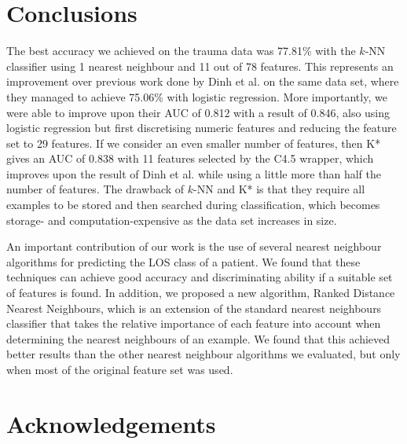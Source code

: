 \documentclass{article}
\begin{document}
\section{Conclusions}
\label{sec:conclusions}
The best accuracy we achieved on the trauma data was 77.81\% with the $k$-NN
classifier using 1 nearest neighbour and 11 out of 78 features. This represents
an improvement over previous work done by Dinh et al. \cite{Dinh2013a}
on the same data set,
where they managed to achieve 75.06\% with logistic regression. More
importantly, we were able to improve upon their AUC of 0.812 with a result of
0.846, also using logistic regression but first discretising numeric features
and reducing the feature set to 29 features.
If we consider an even smaller number of features, then K*
gives an AUC of 0.838 with 11 features selected by the C4.5 wrapper, which
improves upon the result of Dinh et al. \cite{Dinh2013a} while using a little
more than half
the number of features. The drawback of $k$-NN and K* is that they require all
examples to be stored and then searched during classification, which becomes
storage- and computation-expensive as the data set increases in size.

An important contribution of our work is the use of several nearest neighbour
algorithms for predicting the LOS class of a patient. We found that these
techniques can achieve good accuracy and discriminating ability if a suitable
set of features is found. In addition, we proposed a new algorithm, Ranked
Distance Nearest Neighbours, which is an extension of the standard nearest
neighbours classifier that takes the relative importance
of each feature into account when determining the nearest neighbours of an
example. We found that this achieved better results than the other nearest
neighbour algorithms we evaluated, but only when most of the original feature
set was used.

\section*{Acknowledgements}

{
  
}
\end{document}
